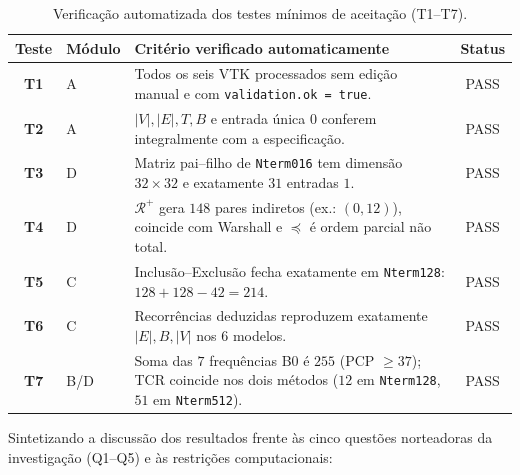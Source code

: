 \documentclass[11pt, a4paper]{article}
\begin{document}
\begin{table}[htbp]
  \centering
  \footnotesize
  \caption{Verificação automatizada dos testes mínimos de aceitação (T1--T7).}
  \label{tab:testes}
  \begin{tabularx}{\textwidth}{clXc}
    \toprule
    \textbf{Teste} & \textbf{Módulo} & \textbf{Critério verificado automaticamente} & \textbf{Status} \\
    \midrule
    \textbf{T1} & A   & Todos os seis VTK processados sem edição manual e com \texttt{validation.ok = true}. & PASS \\
    \textbf{T2} & A   & $|V|, |E|, T, B$ e entrada única $0$ conferem integralmente com a especificação. & PASS \\
    \textbf{T3} & D   & Matriz pai--filho de \texttt{Nterm016} tem dimensão $32\times 32$ e exatamente $31$ entradas $1$. & PASS \\
    \textbf{T4} & D   & $\mathcal{R}^+$ gera $148$ pares indiretos (ex.: $(0,12)$), coincide com Warshall e $\preceq$ é ordem parcial não total. & PASS \\
    \textbf{T5} & C   & Inclusão--Exclusão fecha exatamente em \texttt{Nterm128}: $128 + 128 - 42 = 214$. & PASS \\
    \textbf{T6} & C   & Recorrências deduzidas reproduzem exatamente $|E|, B, |V|$ nos $6$ modelos. & PASS \\
    \textbf{T7} & B/D & Soma das $7$ frequências B0 é $255$ (PCP $\ge 37$); TCR coincide nos dois métodos ($12$ em \texttt{Nterm128}, $51$ em \texttt{Nterm512}). & PASS \\
    \bottomrule
  \end{tabularx}
\end{table}

Sintetizando a discussão dos resultados frente às cinco questões norteadoras da investigação (Q1--Q5) e às restrições computacionais:
\end{document}
